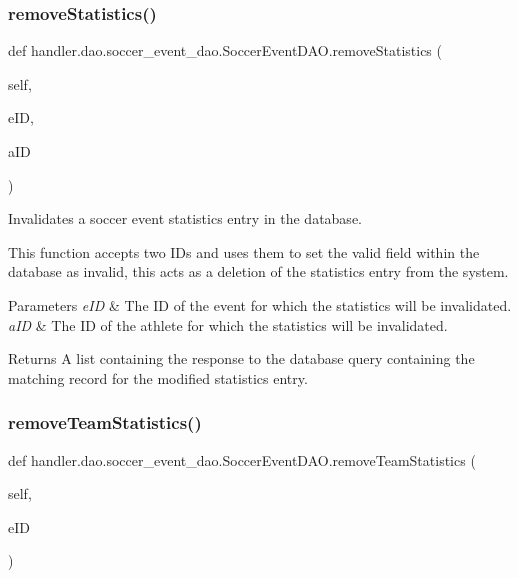 \subsubsection{\texorpdfstring{remove\+Statistics()}{removeStatistics()}}
{\footnotesize\ttfamily def handler.\+dao.\+soccer\+\_\+event\+\_\+dao.\+Soccer\+Event\+D\+A\+O.\+remove\+Statistics (\begin{DoxyParamCaption}\item[{}]{self,  }\item[{}]{e\+ID,  }\item[{}]{a\+ID }\end{DoxyParamCaption})}



Invalidates a soccer event statistics entry in the database. 

This function accepts two I\+Ds and uses them to set the valid field within the database as invalid, this acts as a deletion of the statistics entry from the system.


\begin{DoxyParams}{Parameters}
{\em e\+ID} & The ID of the event for which the statistics will be invalidated. \\
\hline
{\em a\+ID} & The ID of the athlete for which the statistics will be invalidated.\\
\hline
\end{DoxyParams}
\begin{DoxyReturn}{Returns}
A list containing the response to the database query containing the matching record for the modified statistics entry. 
\end{DoxyReturn}
\mbox{\label{classhandler_1_1dao_1_1soccer__event__dao_1_1_soccer_event_d_a_o_ab5314993a7cd3d1ca3cd773826b5a1b1}} 
\subsubsection{\texorpdfstring{remove\+Team\+Statistics()}{removeTeamStatistics()}}
{\footnotesize\ttfamily def handler.\+dao.\+soccer\+\_\+event\+\_\+dao.\+Soccer\+Event\+D\+A\+O.\+remove\+Team\+Statistics (\begin{DoxyParamCaption}\item[{}]{self,  }\item[{}]{e\+ID }\end{DoxyParamCaption})}



